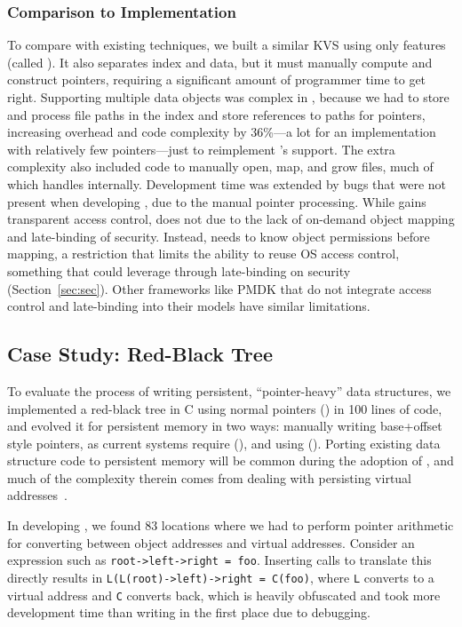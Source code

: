 \subsubsection{Comparison to \unix Implementation}

To compare with existing techniques, we built a
similar KVS using only \unix features (called \unixkv). It also separates index and data, but it
must manually compute and construct pointers, requiring a significant amount of programmer time to
get right.
Supporting multiple data objects was complex in \unixkv, because we had to store and process file
paths in the index and store references to paths for pointers, increasing overhead and code
complexity by 36\%---a lot for an implementation with relatively few pointers---just to reimplement
\Twizzler's support. The extra complexity also included code to manually open, map, and
grow files, much of which \Twizzler handles internally. Development time was extended by
bugs that were not present when developing \nvkv, due to the manual pointer processing.  While \nvkv
gains transparent access control, \unixkv does not due to the lack of
on-demand object mapping and late-binding of security. Instead, \unixkv needs to know object permissions before
mapping,
a restriction that limits the ability to reuse OS access control, something that
\nvkv could leverage through late-binding on security (Section~\ref{sec:sec}). Other frameworks like PMDK
that do not integrate access control and late-binding into their models have similar
limitations.


\subsection{Case Study: Red-Black Tree}
To evaluate the process of writing persistent, ``pointer-heavy'' data
structures,
we implemented a red-black tree in C using normal pointers (\ramrbt)
in 100 lines of code,
and evolved it for persistent memory in two ways: manually writing
base+offset style pointers, as current systems require (\unixrbt),
and using \Twizzler (\nvrbt).
Porting existing data structure code to persistent memory
will be common during the adoption of \NVM, and much of the complexity therein
comes from dealing with persisting virtual addresses~\cite{virendra:hotstorage17}.

In developing \unixrbt, we found 83 locations where we had to perform pointer arithmetic for
converting between object addresses and virtual addresses.  Consider an expression such as
\texttt{root->left->right = foo}. Inserting calls to translate this directly results in
\texttt{L(L(root)->left)->right = C(foo)}, where \texttt{L} converts to a virtual address and
\texttt{C} converts back, which is heavily obfuscated and took more development time than writing
\ramrbt in the first place due to debugging.

